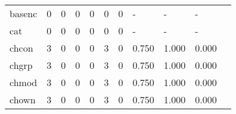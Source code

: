 \begin{longtable}{lp{1.2cm}p{1.2cm}p{1.2cm}p{1.2cm}p{1.2cm}p{1.2cm}p{1.2cm}p{1.2cm}p{1.2cm}p{1.2cm}}
basenc    &                                     0 &                                                  0 &                                                  0 &                                                  0 &                                                  0 &                                                  0 &                                                  - &                                                  - &                                                  - \\
cat       &                                     0 &                                                  0 &                                                  0 &                                                  0 &                                                  0 &                                                  0 &                                                  - &                                                  - &                                                  - \\
chcon     &                                     3 &                                                  0 &                                                  0 &                                                  0 &                                                  3 &                                                  0 &                                              0.750 &                                              1.000 &                                              0.000 \\
chgrp     &                                     3 &                                                  0 &                                                  0 &                                                  0 &                                                  3 &                                                  0 &                                              0.750 &                                              1.000 &                                              0.000 \\
chmod     &                                     3 &                                                  0 &                                                  0 &                                                  0 &                                                  3 &                                                  0 &                                              0.750 &                                              1.000 &                                              0.000 \\
chown     &                                     3 &                                                  0 &                                                  0 &                                                  0 &                                                  3 &                                                  0 &                                              0.750 &                                              1.000 &                                              0.000 \\

\end{longtable}
